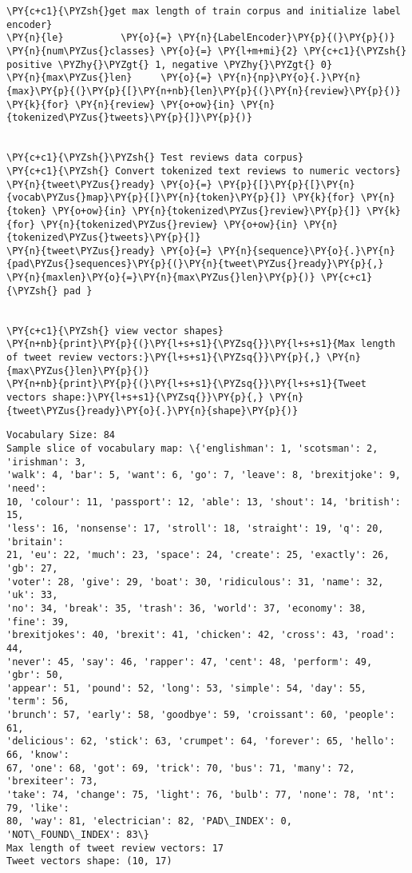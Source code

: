\begin{tcolorbox}[breakable, size=fbox, boxrule=1pt, pad at break*=1mm,colback=cellbackground, colframe=cellborder]
\begin{Verbatim}[commandchars=\\\{\}]
\PY{c+c1}{\PYZsh{}get max length of train corpus and initialize label encoder}
\PY{n}{le}          \PY{o}{=} \PY{n}{LabelEncoder}\PY{p}{(}\PY{p}{)}
\PY{n}{num\PYZus{}classes} \PY{o}{=} \PY{l+m+mi}{2} \PY{c+c1}{\PYZsh{} positive \PYZhy{}\PYZgt{} 1, negative \PYZhy{}\PYZgt{} 0}
\PY{n}{max\PYZus{}len}     \PY{o}{=} \PY{n}{np}\PY{o}{.}\PY{n}{max}\PY{p}{(}\PY{p}{[}\PY{n+nb}{len}\PY{p}{(}\PY{n}{review}\PY{p}{)} \PY{k}{for} \PY{n}{review} \PY{o+ow}{in} \PY{n}{tokenized\PYZus{}tweets}\PY{p}{]}\PY{p}{)}


\PY{c+c1}{\PYZsh{}\PYZsh{} Test reviews data corpus}
\PY{c+c1}{\PYZsh{} Convert tokenized text reviews to numeric vectors}
\PY{n}{tweet\PYZus{}ready} \PY{o}{=} \PY{p}{[}\PY{p}{[}\PY{n}{vocab\PYZus{}map}\PY{p}{[}\PY{n}{token}\PY{p}{]} \PY{k}{for} \PY{n}{token} \PY{o+ow}{in} \PY{n}{tokenized\PYZus{}review}\PY{p}{]} \PY{k}{for} \PY{n}{tokenized\PYZus{}review} \PY{o+ow}{in} \PY{n}{tokenized\PYZus{}tweets}\PY{p}{]}
\PY{n}{tweet\PYZus{}ready} \PY{o}{=} \PY{n}{sequence}\PY{o}{.}\PY{n}{pad\PYZus{}sequences}\PY{p}{(}\PY{n}{tweet\PYZus{}ready}\PY{p}{,} \PY{n}{maxlen}\PY{o}{=}\PY{n}{max\PYZus{}len}\PY{p}{)} \PY{c+c1}{\PYZsh{} pad }


\PY{c+c1}{\PYZsh{} view vector shapes}
\PY{n+nb}{print}\PY{p}{(}\PY{l+s+s1}{\PYZsq{}}\PY{l+s+s1}{Max length of tweet review vectors:}\PY{l+s+s1}{\PYZsq{}}\PY{p}{,} \PY{n}{max\PYZus{}len}\PY{p}{)}
\PY{n+nb}{print}\PY{p}{(}\PY{l+s+s1}{\PYZsq{}}\PY{l+s+s1}{Tweet vectors shape:}\PY{l+s+s1}{\PYZsq{}}\PY{p}{,} \PY{n}{tweet\PYZus{}ready}\PY{o}{.}\PY{n}{shape}\PY{p}{)}
\end{Verbatim}
\end{tcolorbox}

    \begin{Verbatim}[commandchars=\\\{\}]
Vocabulary Size: 84
Sample slice of vocabulary map: \{'englishman': 1, 'scotsman': 2, 'irishman': 3,
'walk': 4, 'bar': 5, 'want': 6, 'go': 7, 'leave': 8, 'brexitjoke': 9, 'need':
10, 'colour': 11, 'passport': 12, 'able': 13, 'shout': 14, 'british': 15,
'less': 16, 'nonsense': 17, 'stroll': 18, 'straight': 19, 'q': 20, 'britain':
21, 'eu': 22, 'much': 23, 'space': 24, 'create': 25, 'exactly': 26, 'gb': 27,
'voter': 28, 'give': 29, 'boat': 30, 'ridiculous': 31, 'name': 32, 'uk': 33,
'no': 34, 'break': 35, 'trash': 36, 'world': 37, 'economy': 38, 'fine': 39,
'brexitjokes': 40, 'brexit': 41, 'chicken': 42, 'cross': 43, 'road': 44,
'never': 45, 'say': 46, 'rapper': 47, 'cent': 48, 'perform': 49, 'gbr': 50,
'appear': 51, 'pound': 52, 'long': 53, 'simple': 54, 'day': 55, 'term': 56,
'brunch': 57, 'early': 58, 'goodbye': 59, 'croissant': 60, 'people': 61,
'delicious': 62, 'stick': 63, 'crumpet': 64, 'forever': 65, 'hello': 66, 'know':
67, 'one': 68, 'got': 69, 'trick': 70, 'bus': 71, 'many': 72, 'brexiteer': 73,
'take': 74, 'change': 75, 'light': 76, 'bulb': 77, 'none': 78, 'nt': 79, 'like':
80, 'way': 81, 'electrician': 82, 'PAD\_INDEX': 0, 'NOT\_FOUND\_INDEX': 83\}
Max length of tweet review vectors: 17
Tweet vectors shape: (10, 17)
    \end{Verbatim}

